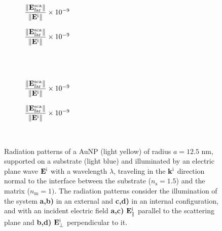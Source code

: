 \begin{figure}[t!]
    \centering
    \def\svgwidth{.8\textwidth}
    \hspace*{-.215\textwidth}%
    \vspace*{-.5em}%
        \begin{subfigure}{.32\textwidth}\caption{\footnotesize$\dfrac{\norm{\vb{E}^\text{sca}_\text{far}}}{\norm{\vb{E}^\text{i}}} \times 10^{-9}$  }\label{sfig:Far:Sup:Norm:a}\end{subfigure}%
        \begin{subfigure}{.4\textwidth}\caption{\footnotesize$\dfrac{\norm{\vb{E}^\text{sca}_\text{far}}}{\norm{\vb{E}^\text{i}}} \times 10^{-9}$  }\label{sfig:Far:Sup:Norm:b}\end{subfigure}\\
    \\
    \def\svgwidth{.8\textwidth}
    \hspace*{-.215\textwidth}%
    \vspace*{-.5em}%
        \begin{subfigure}{.32\textwidth}\caption{\footnotesize$\dfrac{\norm{\vb{E}^\text{sca}_\text{far}}}{\norm{\vb{E}^\text{i}}} \times 10^{-9}$  }\label{sfig:Far:Sup:Norm:c}\end{subfigure}%
        \begin{subfigure}{.4\textwidth}\caption{\footnotesize$\dfrac{\norm{\vb{E}^\text{sca}_\text{far}}}{\norm{\vb{E}^\text{i}}} \times 10^{-9}$  }\label{sfig:Far:Sup:Norm:d}\end{subfigure}\\
    \caption[  Radiation pattern of a AuNP supported into a substrate illuminated at normal incidence ]{Radiation patterns of a AuNP (light yellow) of radius $a = 12.5$ nm, supported on a substrate (light blue) and illuminated by an electric plane wave $\vb{E}^\text{i}$ with a wavelength $\lambda$, traveling in the $\vb{k}^\text{i}$ direction normal to the interface between the substrate ($n_\text{s} = 1.5$) and the matrix ($n_\text{m} = 1)$. The radiation patterns consider the illumination of the system  \textbf{a,b)} in an external and  \textbf{c,d)} in an internal configuration, and with an incident electric field \textbf{a,c)}  $\vb{E}^\text{i}_\parallel$ parallel to the scattering plane and \textbf{b,d)} $\vb{E}^\text{i}_\perp$ perpendicular to it.}
    \label{fig:Far:Sup:Norm}
\end{figure}

